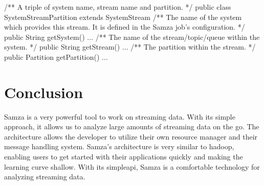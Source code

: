 \documentclass[9pt,twocolumn,twoside]{styles/osajnl}
\begin{document}
/** A triple of system name, stream name and partition. */\newline
public class SystemStreamPartition extends SystemStream {\newline
  /** The name of the system which provides this stream. It is
      defined in the Samza job's configuration. */\newline
  public String getSystem() { ... }\newline
  /** The name of the stream/topic/queue within the system. */\newline
  public String getStream() { ... }\newline
  /** The partition within the stream. */\newline
  public Partition getPartition() { ... }\newline
}

\section{Conclusion}
Samza is a very powerful tool to work on streaming data. With its simple
approach, it allows us to analyze large amounts of streaming data on the go. The
architecture allows the developer to utilize their own resource manager and
their message handling system. Samza's architecture is very similar to hadoop,
enabling users to get started with their applications quickly and making the
learning curve shallow. With its simpleapi, Samza is a comfortable technology
for analyzing streaming data.


\end{document}
